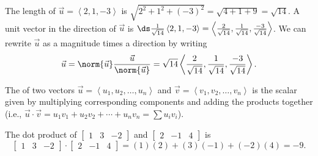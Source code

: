 \begin{example}
The length of $\vec u=\left<2,1,-3\right>$ is $\sqrt{2^2+1^2+(-3)^2} = \sqrt{4+1+9}=\sqrt{14}$.  
A unit vector in the direction of $\vec u$ is 
$\ds\frac{1}{\sqrt{14}}\left<2,1,-3\right> = \left<\frac{2}{\sqrt{14}},\frac{1}{\sqrt{14}},\frac{-3}{\sqrt{14}}\right>$. 
We can rewrite $\vec u$ as a magnitude times a direction by writing 
$$\vec u = \norm{\vec u} \frac{\vec u}{\norm{\vec u}} = \sqrt{14} \left<\frac{2}{\sqrt{14}},\frac{1}{\sqrt{14}},\frac{-3}{\sqrt{14}}\right>.$$ 
\end{example}


The  of two vectors $\vec u = \left<u_1,u_2,\ldots,u_n\right>$ and $\vec v =\left<v_1,v_2,\ldots,v_n\right>$ is the scalar given by multiplying corresponding components and adding the products together (i.e., $\vec u\cdot \vec v = u_1v_1+u_2v_2+\cdots+u_nv_n = \sum u_iv_i$).
\begin{example} \label{ex dot product}
The dot product of $\begin{bmatrix}1&3&-2\end{bmatrix}$ and $\begin{bmatrix}2&-1&4\end{bmatrix}$ is
 $$\begin{bmatrix}1&3&-2\end{bmatrix}\cdot \begin{bmatrix}2&-1&4\end{bmatrix} = (1)(2)+(3)(-1)+(-2)(4)=-9.$$ 
\end{example}

